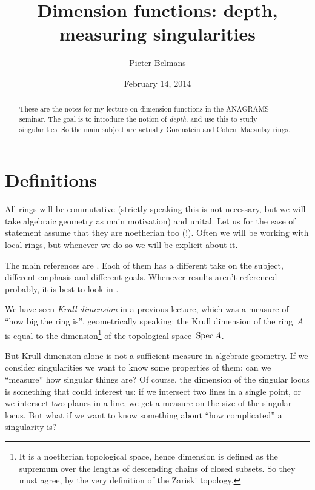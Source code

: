 \documentclass[10pt,a4paper]{article}
\title{Dimension functions: depth, measuring singularities}
\author{Pieter Belmans}
\date{February 14, 2014}
\begin{document}
\maketitle

\begin{abstract}
  These are the notes for my lecture on dimension functions in the ANAGRAMS seminar. The goal is to introduce the notion of \emph{depth}, and use this to study singularities. So the main subject are actually Gorenstein and Cohen--Macaulay rings.
\end{abstract}

\tableofcontents

\clearpage

\section{Definitions}
\label{section:definitions}
All rings will be commutative (strictly speaking this is not necessary, but we will take algebraic geometry as main motivation) and unital. Let us for the ease of statement assume that they are noetherian too (!). Often we will be working with local rings, but whenever we do so we will be explicit about it.

The main references are \cite{sga2,eisenbud-commutative-algebra,serre-algebre-locale}. Each of them has a different take on the subject, different emphasis and different goals. Whenever results aren't referenced probably, it is best to look in \cite{eisenbud-commutative-algebra}.

We have seen \emph{Krull dimension} in a previous lecture, which was a measure of ``how big the ring is'', geometrically speaking: the Krull dimension of the ring~$A$ is equal to the dimension\footnote{It is a noetherian topological space, hence dimension is defined as the supremum over the lengths of descending chains of closed subsets. So they must agree, by the very definition of the Zariski topology.} of the topological space~$\operatorname{Spec} A$.

But Krull dimension alone is not a sufficient measure in algebraic geometry. If we consider singularities we want to know some properties of them: can we ``measure'' how singular things are? Of course, the dimension of the singular locus is something that could interest us: if we intersect two lines in a single point, or we intersect two planes in a line, we get a measure on the size of the singular locus. But what if we want to know something about ``how complicated'' a singularity is?
\end{document}
